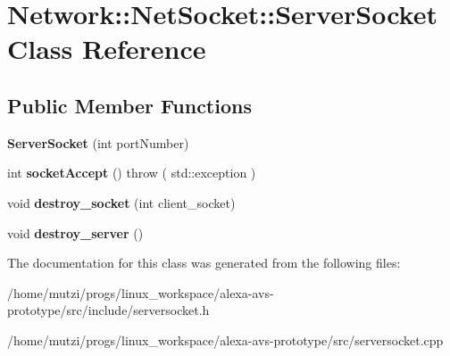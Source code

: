 \hypertarget{classNetwork_1_1NetSocket_1_1ServerSocket}{}\section{Network\+:\+:Net\+Socket\+:\+:Server\+Socket Class Reference}
\label{classNetwork_1_1NetSocket_1_1ServerSocket}
\subsection*{Public Member Functions}
\begin{DoxyCompactItemize}
\item 
\mbox{\label{classNetwork_1_1NetSocket_1_1ServerSocket_a50d9085b678fcd32f0ebfbcbcd4198cc}} 
{\bfseries Server\+Socket} (int port\+Number)
\item 
\mbox{\label{classNetwork_1_1NetSocket_1_1ServerSocket_a4d2a3ecda6b18f9eeadf4d21f3f8bc06}} 
int {\bfseries socket\+Accept} ()  throw ( std\+::exception )
\item 
\mbox{\label{classNetwork_1_1NetSocket_1_1ServerSocket_a2b80f507eeee6c22889e63eb164429e5}} 
void {\bfseries destroy\+\_\+socket} (int client\+\_\+socket)
\item 
\mbox{\label{classNetwork_1_1NetSocket_1_1ServerSocket_a98ab276ee61212119614f789d167ef7b}} 
void {\bfseries destroy\+\_\+server} ()
\end{DoxyCompactItemize}


The documentation for this class was generated from the following files\+:\begin{DoxyCompactItemize}
\item 
/home/mutzi/progs/linux\+\_\+workspace/alexa-\/avs-\/prototype/src/include/serversocket.\+h\item 
/home/mutzi/progs/linux\+\_\+workspace/alexa-\/avs-\/prototype/src/serversocket.\+cpp\end{DoxyCompactItemize}
